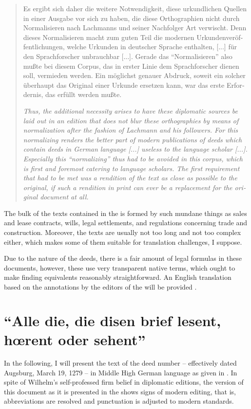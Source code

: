 \documentclass[12pt,paper=a4]{scrartcl}
\begin{document}
\foreignblockquote{german}{\begin{multicols}{2}Es ergibt sich daher die weitere 
Notwendigkeit, diese urkundlichen Quellen in einer Ausgabe vor sich zu haben, 
die diese Orthographien nicht durch Normalisieren nach Lachmanns und seiner 
Nachfolger Art verwischt. Denn dieses Normalisieren macht zum guten Teil die 
modernen Urkundenveröffentlichungen, welche Urkunden in deutscher Sprache 
enthalten, [...] für den Sprachforscher unbrauchbar [...]. Gerade das 
\enquote{Normalisieren} also mußte bei diesem Corpus, das in erster Linie dem 
Sprachforscher dienen soll, vermieden werden. Ein möglichst genauer Abdruck, 
soweit ein solcher überhaupt das Original einer Urkunde ersetzen kann, war das 
erste Erfordernis, das erfüllt werden mußte. \autocite[LX]{CAO1}

\columnbreak

{\itshape Thus, the additional necessity arises to have these diplomatic sources 
be laid out in an edition that does not blur these orthographies by means of 
normalization after the fashion of Lachmann and his followers. For this 
normalizing renders the better part of modern publications of deeds which 
contain deeds in German language [...] useless to the language scholar [...]. 
Especially this \enquote{normalizing} thus had to be avoided in this corpus, 
which is first and foremost catering to language scholars. The first requirement 
that had to be met was a rendition of the text as close as possible to the 
original, if such a rendition in print can ever be a replacement for the 
original document at all.}\end{multicols}}

The bulk of the texts contained in the  is formed by such mundane 
things as sales and lease contracts, wills, legal settlements, and regulations 
concerning trade and construction. Moreover, the texts are usually not too long 
and not too complex either, which makes some of them suitable for translation 
challenges, I suppose.

Due to the nature of the deeds, there is a fair amount of legal formulas in 
these documents, however, these use very transparent native terms, which ought 
to make finding equivalents reasonably straightforward. An English translation 
based on the annotations by the editors of the  will be provided 
\autocite[see][]{n163-online}.

\section{\enquote{Alle die, die disen brief lesent, hœrent oder sehent}}
In the following, I will present the text of the deed number 
 -- effectively dated Augsburg, March 19, 1279 -- in 
Middle High German language as given in \textcites{n163}{n163-online}. In spite 
of Wilhelm's self-professed firm belief in diplomatic editions, the version of 
this document as it is presented in the  shows signs of modern 
editing, that is, abbreviations are resolved and punctuation is adjusted to 
modern standards.
\end{document}
